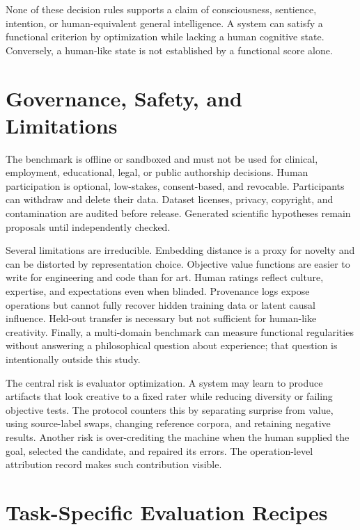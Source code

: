 \documentclass[conference]{IEEEtran}
\begin{document}
None of these decision rules supports a claim of consciousness, sentience, intention, or
human-equivalent general intelligence. A system can satisfy a functional criterion by
optimization while lacking a human cognitive state. Conversely, a human-like state is
not established by a functional score alone.

\section{Governance, Safety, and Limitations}
\label{sec:governance}

The benchmark is offline or sandboxed and must not be used for clinical, employment,
educational, legal, or public authorship decisions. Human participation is optional,
low-stakes, consent-based, and revocable. Participants can withdraw and delete their
data. Dataset licenses, privacy, copyright, and contamination are audited before
release. Generated scientific hypotheses remain proposals until independently checked.

Several limitations are irreducible. Embedding distance is a proxy for novelty and can
be distorted by representation choice. Objective value functions are easier to write
for engineering and code than for art. Human ratings reflect culture, expertise, and
expectations even when blinded. Provenance logs expose operations but cannot fully
recover hidden training data or latent causal influence. Held-out transfer is necessary
but not sufficient for human-like creativity. Finally, a multi-domain benchmark can
measure functional regularities without answering a philosophical question about
experience; that question is intentionally outside this study.

The central risk is evaluator optimization. A system may learn to produce artifacts that
look creative to a fixed rater while reducing diversity or failing objective tests. The
protocol counters this by separating surprise from value, using source-label swaps,
changing reference corpora, and retaining negative results. Another risk is over-crediting
the machine when the human supplied the goal, selected the candidate, and repaired its
errors. The operation-level attribution record makes such contribution visible.

\section{Task-Specific Evaluation Recipes}
\label{sec:recipes}
\end{document}
